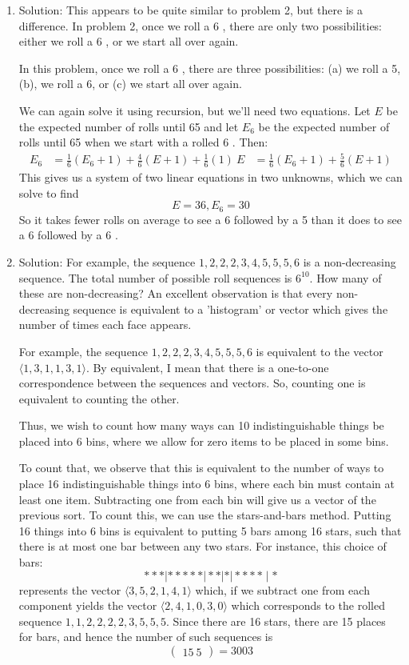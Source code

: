 \begin{enumerate}
\item
Solution: This appears to be quite similar to problem 2, but there is a difference. In problem 2, once we roll a 6 , there are only two possibilities: either we roll a 6 , or we start all over again.

In this problem, once we roll a 6 , there are three possibilities: (a) we roll a 5, (b), we roll a 6, or (c) we start all over again.

We can again solve it using recursion, but we'll need two equations. Let $E$ be the expected number of rolls until 65 and let $E_6$ be the expected number of rolls until 65 when we start with a rolled 6 . Then:
$$
\begin{aligned}
E_6 & =\frac{1}{6}\left(E_6+1\right)+\frac{4}{6}(E+1)+\frac{1}{6}(1) \
E & =\frac{1}{6}\left(E_6+1\right)+\frac{5}{6}(E+1)
\end{aligned}
$$
This gives us a system of two linear equations in two unknowns, which we can solve to find
$$
E=36, E_6=30
$$
So it takes fewer rolls on average to see a 6 followed by a 5 than it does to see a 6 followed by a 6 .




\item
Solution: For example, the sequence ${1,2,2,2,3,4,5,5,5,6}$ is a non-decreasing sequence.
The total number of possible roll sequences is $6^{10}$. How many of these are non-decreasing?
An excellent observation is that every non-decreasing sequence is equivalent to a 'histogram' or vector which gives the number of times each face appears.

For example, the sequence ${1,2,2,2,3,4,5,5,5,6}$ is equivalent to the vector $\langle 1,3,1,1,3,1\rangle$. By equivalent, I mean that there is a one-to-one correspondence between the sequences and vectors. So, counting one is equivalent to counting the other.

Thus, we wish to count how many ways can 10 indistinguishable things be placed into 6 bins, where we allow for zero items to be placed in some bins.

To count that, we observe that this is equivalent to the number of ways to place 16 indistinguishable things into 6 bins, where each bin must contain at least one item. Subtracting one from each bin will give us a vector of the previous sort.
To count this, we can use the stars-and-bars method. Putting 16 things into 6 bins is equivalent to putting 5 bars among 16 stars, such that there is at most one bar between any two stars. For instance, this choice of bars:
$$
* * *|* * * * *| * *|*| * * * * \mid *
$$
represents the vector $\langle 3,5,2,1,4,1\rangle$ which, if we subtract one from each component yields the vector $\langle 2,4,1,0,3,0\rangle$ which corresponds to the rolled sequence $1,1,2,2,2,2,3,5,5,5$.
Since there are 16 stars, there are 15 places for bars, and hence the number of such sequences is
$$
\left(\begin{array}{c}
15 \
5
\end{array}\right)=3003
$$


\end{enumerate}
